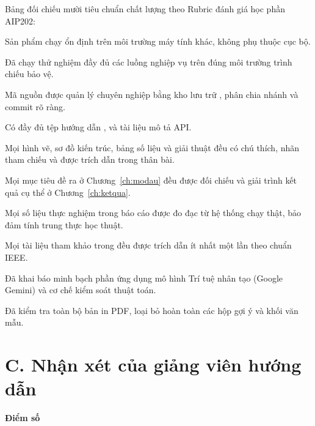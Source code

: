 Bảng đối chiếu mười tiêu chuẩn chất lượng theo Rubric đánh giá học phần AIP202:

\begin{tukiem}
  \item Sản phẩm chạy ổn định trên môi trường máy tính khác, không phụ thuộc cục bộ.
  \item Đã chạy thử nghiệm đầy đủ các luồng nghiệp vụ trên đúng môi trường trình chiếu bảo vệ.
  \item Mã nguồn được quản lý chuyên nghiệp bằng kho lưu trữ , phân chia nhánh và commit rõ ràng.
  \item Có đầy đủ tệp hướng dẫn ,  và tài liệu mô tả API.
  \item Mọi hình vẽ, sơ đồ kiến trúc, bảng số liệu và giải thuật đều có chú thích, nhãn tham chiếu và được trích dẫn trong thân bài.
  \item Mọi mục tiêu đề ra ở Chương~\ref{ch:modau} đều được đối chiếu và giải trình kết quả cụ thể ở Chương~\ref{ch:ketqua}.
  \item Mọi số liệu thực nghiệm trong báo cáo được đo đạc từ hệ thống chạy thật, bảo đảm tính trung thực học thuật.
  \item Mọi tài liệu tham khảo trong  đều được trích dẫn ít nhất một lần theo chuẩn IEEE.
  \item Đã khai báo minh bạch phần ứng dụng mô hình Trí tuệ nhân tạo (Google Gemini) và cơ chế kiểm soát thuật toán.
  \item Đã kiểm tra toàn bộ bản in PDF, loại bỏ hoàn toàn các hộp gợi ý và khối văn mẫu.
\end{tukiem}

\section*{C. Nhận xét của giảng viên hướng dẫn}
{}

\khungnhanxet[7.5cm]

\vspace{0.8em}
\noindent\begin{minipage}[t]{0.5\textwidth}
\color{daunavy}
{\color{daumaroon}\bfseries Điểm số}

\vspace{0.7em}

\vspace{0.9em}
\end{minipage}\hfill
{}
